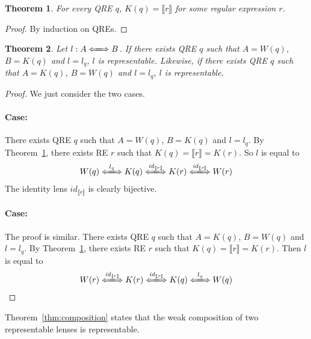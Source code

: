 \documentclass[a4paper,11pt] {article}
\theoremstyle{plain}
\newtheorem{theorem}{Theorem}[section]
\newcommand{\lensbetween}[1]{\xLongleftrightarrow{#1}}
\begin{document}
\begin{theorem}
  \label{thm:kernel-rep}
  For every QRE $q$, $K(q) = \llbracket r \rrbracket$ for some regular
  expression $r$.
\end{theorem}
\begin{proof}
  By induction on QREs.
\end{proof}

\begin{theorem}
  Let $l: A \lensbetween{} B$. If there exists QRE $q$ such that
  $A = W(q)$, $B = K(q)$ and $l = l_q$, $l$ is representable.
  Likewise, if there exists QRE $q$ such that $A = K(q)$, $B = W(q)$
  and $l = l_q$, $l$ is representable.
\end{theorem}
\begin{proof}
  We just consider the two cases.
  
  \paragraph{Case:}
  There exists QRE $q$ such that $A = W(q)$, $B = K(q)$ and
  $l = l_q$.
  By Theorem~\ref{thm:kernel-rep},
  there exists RE $r$ such that
  $K(q) = \llbracket r \rrbracket = K(r)$.
  So $l$ is equal to 
  \begin{align*}
    W(q) \lensbetween{l_q}
    K(q) \lensbetween{\mathit{id}_{\llbracket r \rrbracket}} K(r)
    \lensbetween{\mathit{id}_{\llbracket r \rrbracket}}
    W(r)
  \end{align*}
  The identity lens $\mathit{id}_{\llbracket r \rrbracket}$ is
  clearly bijective.
  
  \paragraph{Case:}
  The proof is similar.
  There exists QRE $q$ such that $A = K(q)$, $B = W(q)$
  and $l = l_q$.
  By Theorem~\ref{thm:kernel-rep},
  there exists RE $r$ such that
  $K(q) = \llbracket r \rrbracket = K(r)$.
  Then $l$ is equal to 
  \begin{align*}
    W(r)
    \lensbetween{\mathit{id}_{\llbracket r \rrbracket}} K(r)
    \lensbetween{\mathit{id}_{\llbracket r \rrbracket}}
    K(q) \lensbetween{l_q} W(q)
  \end{align*}
\end{proof}
Theorem~\ref{thm:composition} states that the weak composition of
two representable lenses is representable.
\end{document}
